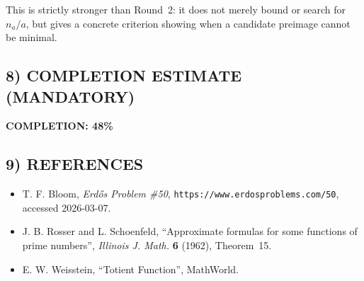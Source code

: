 This is strictly stronger than Round~2: it does not merely bound or search for $n_a/a$, but gives a concrete criterion showing when a candidate preimage cannot be minimal.

\subsection*{8) COMPLETION ESTIMATE (MANDATORY)}
\textbf{COMPLETION: 48\%}

\subsection*{9) REFERENCES}
\begin{itemize}
\item T. F. Bloom, \emph{Erd\H{o}s Problem \#50}, \texttt{https://www.erdosproblems.com/50}, accessed 2026-03-07.
\item J. B. Rosser and L. Schoenfeld, ``Approximate formulas for some functions of prime numbers'', \emph{Illinois J. Math.} \textbf{6} (1962), Theorem~15.
\item E. W. Weisstein, ``Totient Function'', MathWorld.
\end{itemize}
